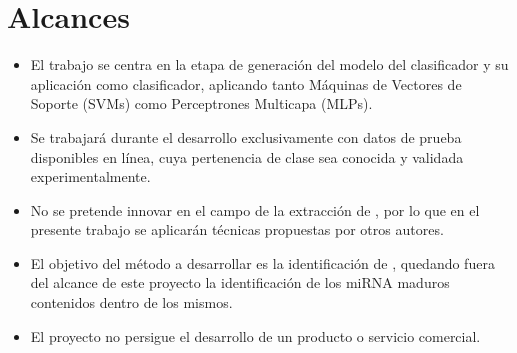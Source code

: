 %
%
%
\section{Alcances}
%
\begin{itemize}
\item
  El trabajo se centra en la etapa de generación del modelo del
  clasificador y su aplicación como clasificador, aplicando tanto
  Máquinas de Vectores de Soporte (SVMs) como Perceptrones Multicapa
  (MLPs).
\item
  Se trabajará durante el desarrollo exclusivamente con datos de
  prueba disponibles en línea, cuya pertenencia de clase sea conocida
  y validada experimentalmente.
\item
  No se pretende innovar en el campo de la extracción de ,
  por lo que en el presente trabajo se aplicarán técnicas propuestas
  por otros autores.
\item
  El objetivo del método a desarrollar es la identificación de
  , quedando fuera del alcance de este proyecto la
  identificación de los miRNA maduros contenidos dentro de los mismos.
\item
  El proyecto no persigue el desarrollo de un producto o servicio
  comercial.
\end{itemize}
%
